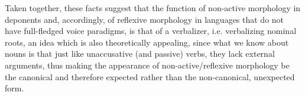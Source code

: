 \documentclass[output=paper]{langsci/langscibook}
\begin{document}
\ea\label{ex:key:10.22} 
    \z
\z

Taken together, these facts suggest that the function of non-active morphology
in deponents and, accordingly, of reflexive morphology in languages that do not
have full-fledged voice paradigms, is that of a verbalizer, i.e. verbalizing
nominal roots, an idea which is also theoretically appealing, since what we
know about nouns is that just like unaccusative (and passive) verbs, they lack
external arguments, thus making the appearance of non-active/reflexive
morphology be the canonical and therefore expected rather than the
non-canonical, unexpected form.
\end{document}
